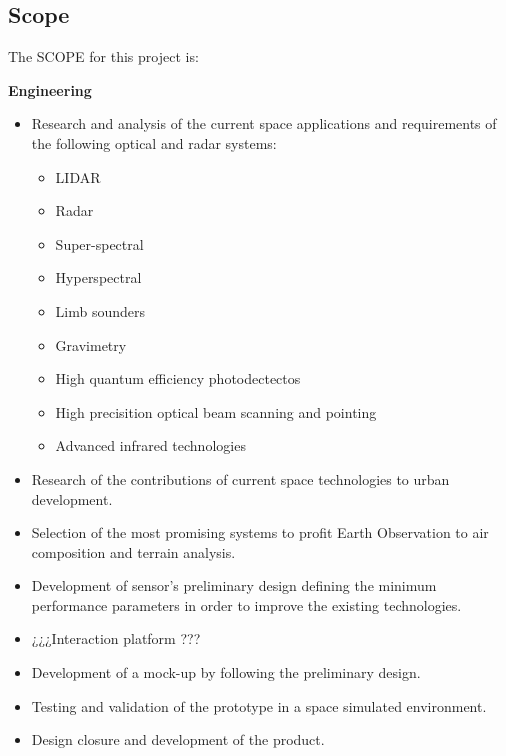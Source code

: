 \subsection{Scope}


The SCOPE for this project is:

{\bfseries Engineering} 
\begin{itemize}

	\item Research and analysis of the current space applications and requirements of the following optical and radar systems:

		\begin{itemize}

		\item LIDAR
		\item Radar
		\item Super-spectral
		\item Hyperspectral
		\item Limb sounders
		\item Gravimetry
		\item High quantum efficiency photodectectos
		\item High precisition optical beam scanning and pointing
		\item Advanced infrared technologies

		\end{itemize}

	\item Research of the contributions of current space technologies to urban development.

	\item Selection of the most promising systems to profit Earth Observation to air composition and terrain analysis.
	
	\item Development of sensor's preliminary design defining the minimum performance parameters in order to improve the existing technologies.

	\item ¿¿¿Interaction platform ???

	\item Development of a mock-up by following the preliminary design.

	\item Testing and validation of the prototype in a space simulated environment.

	\item Design closure and development of the product.

\end{itemize}

